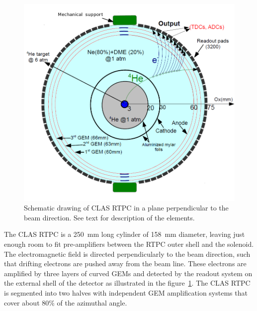 \documentclass[twocolumn,showpacs,superscriptaddress,groupedaddress]{revtex4}
\begin{document}
\begin{figure}[tb]
\centering
\includegraphics[scale=0.28]{fig/RTPC_1_all.png}
\caption{Schematic drawing of CLAS RTPC in a plane perpendicular to 
the beam direction.  See text for description of the elements.} 
\label{fig:RTPC_1_4}
\end{figure} 

The CLAS RTPC is a 250~mm long cylinder of 158~mm diameter, leaving just enough 
room to fit pre-amplifiers between the RTPC outer shell and the solenoid. The 
electromagnetic field is directed perpendicularly to the beam direction, 
such that drifting electrons are pushed away from the beam line. These electrons 
are amplified by three layers of curved GEMs and detected by the readout system 
on the external shell of the detector as illustrated in the figure~\ref{fig:RTPC_1_4}. The CLAS 
RTPC is segmented into two halves with independent GEM amplification systems that 
cover about 80\% of the azimuthal angle.
\end{document}
